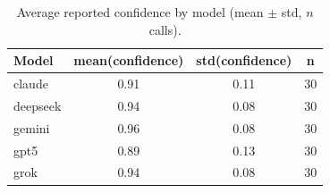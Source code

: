 \begin{table}[h]
\centering
\caption{Average reported confidence by model (mean $\pm$ std, $n$ calls).}
\label{tab:avg-conf}
\begin{tabular}{lccc}
\hline
Model & mean(confidence) & std(confidence) & n \\
\hline
claude & 0.91 & 0.11 & 30 \\
deepseek & 0.94 & 0.08 & 30 \\
gemini & 0.96 & 0.08 & 30 \\
gpt5 & 0.89 & 0.13 & 30 \\
grok & 0.94 & 0.08 & 30 \\
\hline
\end{tabular}
\end{table}

